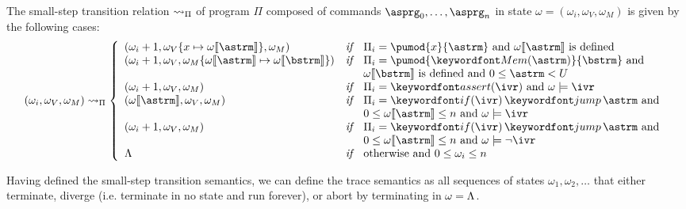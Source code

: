 \documentclass[11pt,twoside]{scrartcl}
\begin{document}
\begin{definition}
The small-step transition relation $\rightsquigarrow_\Pi$ of program $\Pi$ composed of commands $\asprg_0,\ldots,\asprg_n$ in state $\omega = (\omega_i,\omega_V,\omega_M)$ is given by the following cases:
\[
(\omega_i,\omega_V,\omega_M) \smallstep_\Pi
\left\{
\begin{array}{lcl}
(\omega_i+1, \memupd{\omega_V}{x}{\omega\llbracket\astrm\rrbracket}, \omega_M) & \textit{if} & \Pi_i = \pumod{x}{\astrm}~\text{and}~\omega\llbracket\astrm\rrbracket~\text{is defined}

\\

(\omega_i+1, \omega_V, \memupd{\omega_M}{\omega\llbracket\astrm\rrbracket}{\omega\llbracket\bstrm\rrbracket}) & \textit{if} & \Pi_i = \pumod{\pderef{\astrm}}{\bstrm}~\text{and} \\
 & & \omega\llbracket\bstrm\rrbracket~\text{is defined}~\text{and}~0\le\astrm<\maxmem

\\

(\omega_i+1, \omega_V, \omega_M) & \textit{if} & \Pi_i = \passert{\ivr}~\text{and}~\omega\models\ivr

\\

(\omega\llbracket\astrm\rrbracket, \omega_V, \omega_M) & \textit{if} & \Pi_i = \pifjump{\ivr}{\astrm}~\text{and} \\
 & & 0 \le \omega\llbracket\astrm\rrbracket \le n~\text{and}~\omega\models\ivr

\\

(\omega_i+1, \omega_V, \omega_M) & \textit{if} & \Pi_i = \pifjump{\ivr}{\astrm}~\text{and}~ \\
 & & 0 \le \omega\llbracket\astrm\rrbracket \le n~\text{and}~\omega\models\lnot\ivr

\\

\errstate & \textit{if} & \text{otherwise and}~0\le \omega_i \le n

\end{array}
\right.
\]
\end{definition}

Having defined the small-step transition semantics, we can define the trace semantics as all sequences of states $\omega_1, \omega_2, \ldots$ that either terminate, diverge (i.e. terminate in no state and run forever), or abort by terminating in $\omega = \Lambda$.
\end{document}
